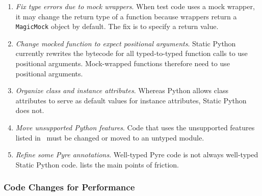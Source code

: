 \documentclass[english,cleveref,crc]{programming}
\newcommand{\SP}{Static Python}
\newcommand{\code}[1]{\texttt{#1}}
\newcommand{\ipara}[1]{\emph{#1}\/.}
\begin{document}
\begin{enumerate}
  \item
    \ipara{Fix type errors due to mock wrappers}
    When test code uses a mock wrapper, it may change the
    return type of a function because wrappers return a \code{MagicMock} object
    by default.
    The fix is to specify a return value.

  \item
    \ipara{Change mocked function to expect positional arguments}
    \SP{} currently rewrites the bytecode for all typed-to-typed function calls to use positional arguments.
    Mock-wrapped functions therefore need to use positional arguments.

  \item
    \ipara{Organize class and instance attributes}
    Whereas Python allows class attributes to serve as default values for instance attributes,
    \SP{} does not.

  \item
    \ipara{Move unsupported Python features}
    Code that uses the unsupported features listed in~
    must be changed or moved to an untyped module.

  \item
    \ipara{Refine some Pyre annotations}
    Well-typed Pyre code is not always well-typed \SP{} code.
     lists the main points of friction.

\end{enumerate}


\subsubsection{Code Changes for Performance}
\end{document}
